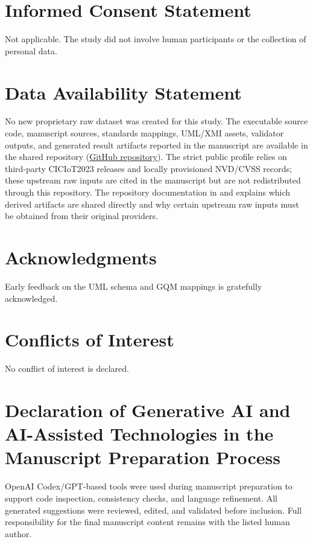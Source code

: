 \documentclass[preprint,12pt]{elsarticle}
\newcommand{\RepoLink}{\href{https://github.com/ErcanErkalkan/AI_Enabled__Standards_Aligned_Security_Risk_Management}{GitHub repository}}
\begin{document}
\section*{Informed Consent Statement}
Not applicable. The study did not involve human participants or the collection of personal data.

\section*{Data Availability Statement}
No new proprietary raw dataset was created for this study. The executable source code, manuscript sources, standards mappings, UML/XMI assets, validator outputs, and generated result artifacts reported in the manuscript are available in the shared repository (\RepoLink). The strict public profile relies on third-party CICIoT2023 releases and locally provisioned NVD/CVSS records; these upstream raw inputs are cited in the manuscript but are not redistributed through this repository. The repository documentation in  and  explains which derived artifacts are shared directly and why certain upstream raw inputs must be obtained from their original providers.

\section*{Acknowledgments}
Early feedback on the UML schema and GQM mappings is gratefully acknowledged.

\section*{Conflicts of Interest}
No conflict of interest is declared.

\section*{Declaration of Generative AI and AI-Assisted Technologies in the Manuscript Preparation Process}
OpenAI Codex/GPT-based tools were used during manuscript preparation to support code inspection, consistency checks, and language refinement. All generated suggestions were reviewed, edited, and validated before inclusion. Full responsibility for the final manuscript content remains with the listed human author.



\end{document}
